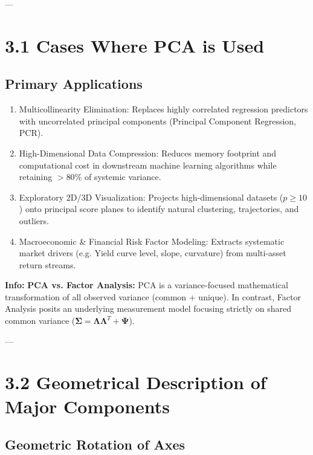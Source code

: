 \documentclass[
]{article}
\begin{document}
---

\textbf{ }

\section{3.1 Cases Where PCA is Used}

\textbf{ }

\subsection{Primary Applications}

\begin{enumerate}
\item
  \textbf{}Multicollinearity Elimination:\textbf{} Replaces highly
  correlated regression predictors with uncorrelated principal
  components (Principal Component Regression, PCR).
\item
  \textbf{}High-Dimensional Data Compression:\textbf{} Reduces memory
  footprint and computational cost in downstream machine learning
  algorithms while retaining \(> 80\%\) of systemic variance.
\item
  \textbf{}Exploratory 2D/3D Visualization:\textbf{} Projects
  high-dimensional datasets (\(p \geq 10\)) onto principal score planes
  to identify natural clustering, trajectories, and outliers.
\item
  \textbf{}Macroeconomic \& Financial Risk Factor Modeling:\textbf{}
  Extracts systematic market drivers (e.g. Yield curve level, slope,
  curvature) from multi-asset return streams.
\end{enumerate}

\textbf{Info: } \textbf{PCA vs. Factor Analysis:} PCA is a
variance-focused mathematical transformation of all observed variance
(common + unique). In contrast, Factor Analysis posits an underlying
measurement model focusing strictly on shared common variance
(\(\mathbf{\Sigma} = \mathbf{\Lambda}\mathbf{\Lambda}^{T} + \mathbf{\Psi}\)).

---

\textbf{ }

\section{3.2 Geometrical Description of Major Components}

\textbf{ }

\subsection{Geometric Rotation of Axes}
\end{document}
